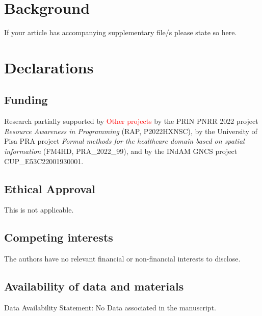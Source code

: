 \documentclass[sn-mathphys-num,a4paper,iicol,lineno,pdflatex]{sn-jnl-hacked}
\theoremstyle{thmwithspace}%
\theoremstyle{thmwithspace}%
\begin{document}
\section{Background}



















\backmatter


If your article has accompanying supplementary file/s please state so here. 


\section*{Declarations}

\subsection*{Funding}

Research partially supported 
by \textcolor{red}{Other projects}
by the PRIN PNRR 2022 project \emph{Resource Awareness in Programming} (RAP, P2022HXNSC),
by the University of Pisa PRA project \emph{Formal methods for the healthcare domain based on spatial information} (FM4HD, PRA\_2022\_99),
and by the INdAM GNCS project CUP\_E53C22001930001.

\subsection*{Ethical Approval}
This is not applicable.
 
\subsection*{Competing interests}
The authors have no relevant financial or non-financial interests to disclose.

\subsection*{Availability of data and materials}
Data Availability Statement: No Data associated in the manuscript.
\end{document}
